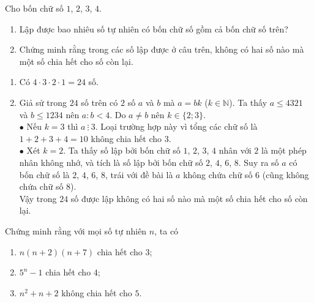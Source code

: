 \begin{bt}%
 Cho bốn chữ số $1$, $2$, $3$, $4$.
 \begin{enumerate}
  \item Lập được bao nhiêu số tự nhiên có bốn chữ số gồm cả bốn chữ số trên?
  \item Chứng minh rằng trong các số lập được ở câu trên, không có hai số nào mà một số chia hết cho số còn lại.
 \end{enumerate}
 \loigiai
  {
  \begin{enumerate}
   \item Có $4\cdot 3\cdot 2 \cdot 1 = 24$ số.
   \item Giả sử trong $24$ số trên có $2$ số $a$ và $b$ mà $a = bk$ ($k \in \mathbb{N}$). Ta thấy $a \le 4321$ và $b \le 1234$ nên $a:b<4$. Do $a \ne b$ nên $k \in \{2;3\}$.\\
   $\bullet$	Nếu $k  = 3$ thì $a \ \vdots \ 3$. Loại trường hợp này vì tổng các chữ số là $1+2+3+4=10$ không chia hết cho $3$.\\
   $\bullet$ Xét $k=2$. Ta thấy số lập bởi bốn  chữ  số $1$, $2$, $3$, $4$ nhân với $2$ là một phép nhân không nhớ, và tích là số lập bởi bốn chữ số $2$, $4$, $6$, $8$. Suy ra số $a$ có bốn chữ số là $2$, $4$, $6$, $8$, trái với đề bài là $a$ không chứa chữ số $6$ (cũng không chứa chữ số $8$).\\
   Vậy trong $24$ số được lập không có hai số nào mà một số chia hết cho số còn lại.
  \end{enumerate}		
  }
\end{bt}

\begin{bt}%
	Chứng minh rằng với mọi số tự nhiên $n$, ta có
	\begin{enumerate}
		\item $n(n+2)(n+7)$ chia hết cho $3$;
		\item $5^n - 1$ chia hết cho $4$;
		\item $n^2+n+2$ không chia hết cho $5$.
	\end{enumerate}
\end{bt}

